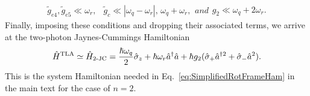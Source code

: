\begin{subequations}
\begin{align}
    \widetilde{g}_{e4},\widetilde{g}_{e5}\ll \omega_r,
\end{align}
\begin{align}
    \widetilde{g}_{c}\ll  |\omega_q-\omega_r|,\, \omega_q+\omega_r,
\end{align}
and
\begin{align}
    {g}_{2}\ll  \omega_q+2\omega_r.
\end{align}
\end{subequations}
Finally, imposing these conditions and dropping their associated terms, we arrive at the two-photon Jaynes-Cummings Hamiltonian
\begin{align}\label{eq:TwoPhJC}
    \hat{H}^{\text{TLA}}\simeq\hat{H}_{\text{2-JC}}=\frac{\hbar \omega_q}{2}\hat{\sigma}_z +\hbar\omega_r\hat{a}^\dagger \hat{a} + \hbar g_{2}(\hat{\sigma}_+ \hat{a}^{\dagger 2} + \hat{\sigma}_- \hat{a}^2).
\end{align}
This is the system Hamiltonian needed in Eq.~\eqref{eq:SimplifiedRotFrameHam} in the main text for the case of $n=2$.


